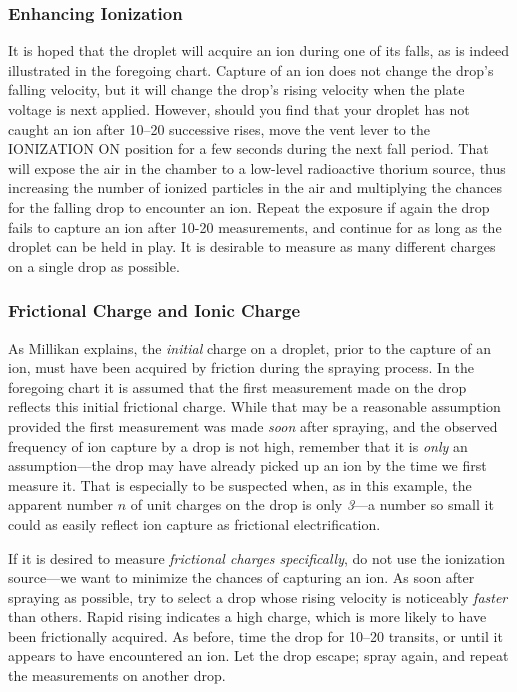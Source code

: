 \subsubsection*{Enhancing Ionization}

It is hoped that the droplet will acquire an ion during one of its
falls, as is indeed illustrated in the foregoing
chart. Capture of an ion does not change the drop's falling velocity,
but it will change the drop's rising velocity when the plate voltage is
next applied. However, should you find that your droplet has not caught
an ion after 10--20 successive rises, move the vent lever to the
IONIZATION ON position for a few seconds during the next fall period.
That will expose the air in the chamber to a low-level radioactive
thorium source, thus increasing the number of ionized particles in the
air and multiplying the chances for the falling drop to encounter an
ion. Repeat the exposure if again the drop fails to capture an ion after
10-20 measurements, and continue for as long as the droplet can be held
in play. It is desirable to measure as many different charges on a
single drop as possible.

\subsubsection*{Frictional Charge and Ionic Charge}

As Millikan explains, the \emph{initial} charge on a droplet, prior to
the capture of an ion, must have been acquired by friction during the
spraying process. In the foregoing chart it is assumed that the first
measurement made on the drop reflects this initial frictional charge.
While that may be a reasonable assumption provided the first measurement
was made \emph{soon} after spraying, and the observed frequency of ion
capture by a drop is not high, remember that it is \emph{only} an
assumption---the drop may have already picked up an ion by the time we
first measure it. That is especially to be suspected when, as in this
example, the apparent number $n$ of unit charges on the drop is
only \emph{3}---a number so small it could as easily reflect ion capture
as frictional electrification.

If it is desired to measure \emph{frictional charges specifically}, do
not use the ionization source---we want to minimize the chances of
capturing an ion. As soon after spraying as possible, try to select a
drop whose rising velocity is noticeably \emph{faster} than others.
Rapid rising indicates a high charge, which is more likely to have been
frictionally acquired. As before, time the drop for 10--20 transits, or
until it appears to have en\-coun\-tered an ion. Let the drop escape; spray
again, and repeat the measurements on another drop.

